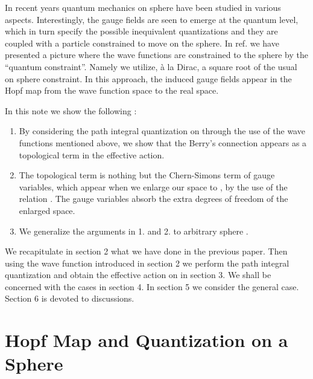 \documentclass[12pt,a4paper]{article}
\begin{document}
In recent years quantum mechanics on sphere \coordHE{} have been studied in
various aspects\cite{McMullan:1995wz}\cite{Ohnuki:1993cb}. Interestingly,
the gauge fields are seen to emerge at the quantum level, which in turn
specify the possible inequivalent quantizations and they are coupled with a
particle constrained to move on the sphere. In ref.\cite{Ikemori:1999yf} we
have presented a picture where the wave functions are constrained to the
sphere by the ``quantum constraint''. Namely we utilize, \`{a} la Dirac, a
square root of the usual on sphere constraint. In this approach, the induced
gauge fields appear in the Hopf map from the wave function space to the real
space.

In this note we show the following :

\begin{enumerate}
\item  By considering the path integral quantization on \coordHE{} through the
use of the wave functions mentioned above, we show that the Berry's
connection appears as a topological term in the effective action.

\item  The topological term is nothing but the Chern-Simons term of gauge
variables, which appear when we enlarge our space \coordHE{} to \coordHE{}, by the
use of the relation \coordHE{}. The gauge variables absorb the
extra degrees of freedom of the enlarged space.

\item  We generalize the arguments in 1. and 2. to arbitrary sphere \coordHE{}.
\end{enumerate}

We recapitulate in section 2 what we have done in the previous paper\cite
{Ikemori:1999yf}. Then using the wave function introduced in section 2 we
perform the path integral quantization and obtain the effective action on \coordHE{} in section 3. We shall be concerned with the cases \coordHE{} in section
4. In section 5 we consider the general case. Section 6 is devoted to
discussions.

\section{Hopf Map and Quantization on a Sphere}
\end{document}
